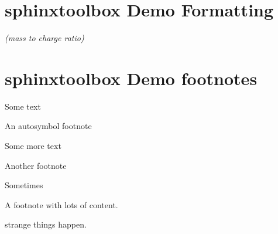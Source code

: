 \documentclass[letterpaper,10pt,english]{sphinxmanual}
\begin{document}
\vspace{4mm}\vspace{-7mm}
\begin{sphinxVerbatim}[commandchars=\\\{\}]
 
\end{sphinxVerbatim}


\chapter{sphinx\sphinxhyphen{}toolbox Demo \sphinxhyphen{} Formatting}
\label{\detokenize{formatting:sphinx-toolbox-demo-formatting}}\label{\detokenize{formatting::doc}}
\textit{ (mass to charge ratio)}

\textit{}


\chapter{sphinx\sphinxhyphen{}toolbox Demo \sphinxhyphen{} footnotes}
\label{\detokenize{footnote_symbols:sphinx-toolbox-demo-footnotes}}\label{\detokenize{footnote_symbols::doc}}
Some text %
\begin{footnote}[2]\sphinxAtStartFootnote
An auto\sphinxhyphen{}symbol footnote
%
\end{footnote}

Some more text %
\begin{footnote}[3]\sphinxAtStartFootnote
Another footnote
%
\end{footnote}

Sometimes %
\begin{footnote}[4]\sphinxAtStartFootnote
A footnote with lots of content.

\sphinxSetupCodeBlockInFootnote
\begin{sphinxVerbatim}[commandchars=\\\{\}]
\end{sphinxVerbatim}
%
\end{footnote} strange things happen.
\end{document}
